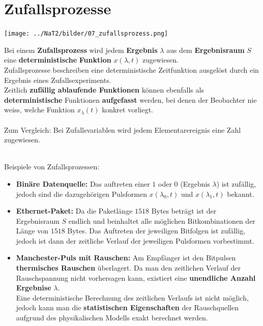 \section{Zufallsprozesse }
\begin{minipage}{10.3cm}
	\texttt{[image: ../NaT2/bilder/07\_zufallsprozess.png]}
\end{minipage}
\begin{minipage}{8.5cm}
	Bei einem \textbf{Zufallsprozess} wird jedem \textbf{Ergebnis} \boldmath$\lambda$ aus 
	dem \textbf{Ergebnisraum} $S$ eine \textbf{deterministische} \textbf{Funktion} $x(\lambda, t)$
	\unboldmath zugewiesen. \\
	Zufallsprozesse beschreiben eine deterministische Zeitfunktion ausgelöst durch ein Ergebnis eines
	Zufallsexperiments. \\
	Zeitlich \textbf{zufällig ablaufende Funktionen} können ebenfalls als \textbf{deterministische} Funktionen 
	\textbf{aufgefasst} werden, bei denen der Beobachter nie weiss, welche Funktion $x_\lambda(t)$ konkret
	vorliegt.	\\ \\
	Zum Vergleich: Bei Zufallsvariablen wird jedem Elementarereignis eine Zahl zugewiesen. 
\end{minipage} 
\vspace{0.5cm} \\
Beispiele von Zufallsprozessen:
\begin{itemize}
  \item \textbf{Binäre Datenquelle:} Das auftreten einer $1$ oder $0$ (Ergebnis $\lambda$) ist
  zufällig, jedoch sind die dazugehörigen Pulsformen $x(\lambda_0, t)$ und $x(\lambda_1, t)$
  bekannt.
  \item \textbf{Ethernet-Paket:} Da die Paketlänge $1518$ Bytes beträgt ist der Ergebnisraum $S$
  endlich und beinhaltet alle möglichen Bitkombinationen der Länge von $1518$ Bytes. Das Auftreten
  der jeweiligen Bitfolgen ist zufällig, jedoch ist dann der zeitliche Verlauf der jeweiligen
  Pulsformen vorbestimmt.
  \item \textbf{Manchester-Puls mit Rauschen:} Am Empfänger ist den Bitpulsen \textbf{thermisches Rauschen}
  überlagert. Da man den zeitlichen Verlauf der Rauschspannung nicht vorhersagen kann, existiert
  eine \textbf{unendliche Anzahl Ergebnise} $\lambda$. \\
  Eine deterministische Berechnung des zeitlichen Verlaufs ist nicht möglich, jedoch kann man die
  \textbf{statistischen Eigenschaften} der Rauschquellen aufgrund des physikalischen Modells exakt berechnet
  werden.
\end{itemize}

